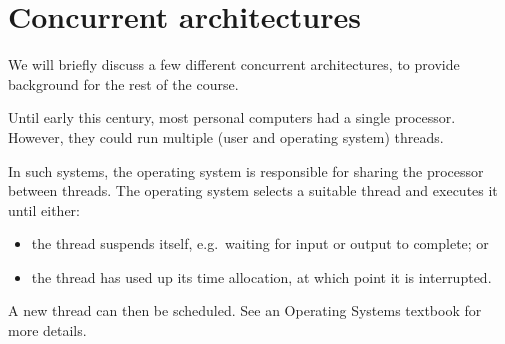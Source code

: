 
\section{Concurrent architectures}

We will briefly discuss a few different concurrent architectures, to provide
background for the rest of the course.



Until early this century, most personal computers had a single processor.
However, they could run multiple (user and operating system) threads.

In such systems, the operating system is responsible for sharing the processor
between threads.  The operating system selects a suitable thread and
executes it until either:
\begin{itemize}
\item
the thread suspends itself, e.g.~waiting for input or output to complete; or

\item
the thread has used up its time allocation, at which point it is interrupted.
\end{itemize}
%
A new thread can then be scheduled.  See an Operating Systems textbook for
more details.





